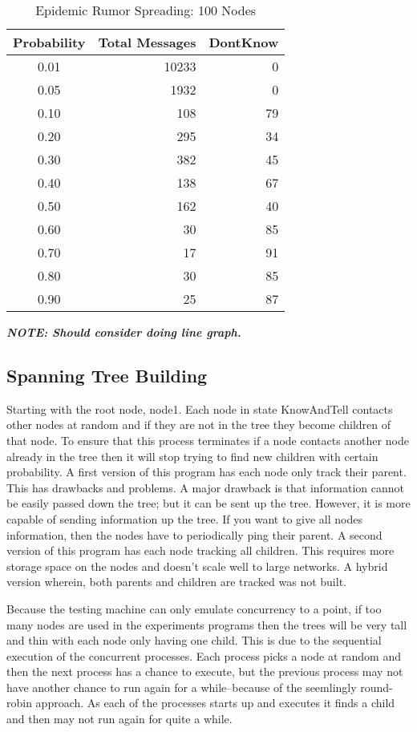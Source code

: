 \documentclass[11pt,twocolumn]{article}
\begin{document}
\begin{table}[h]
\caption{Epidemic Rumor Spreading: 100 Nodes}
\centering
\begin{tabular}{c | r r}
Probability & Total Messages & DontKnow\\
\hline
0.01	& 10233 & 0\\
0.05	& 1932 & 0\\
0.10 & 108 & 79\\
0.20 & 295 & 34\\
0.30 & 382 & 45\\
0.40 & 138 & 67\\
0.50 & 162 & 40\\
0.60 & 30 & 85\\
0.70 & 17 & 91\\
0.80 & 30 & 85\\
0.90 & 25 & 87\\
\hline
\end{tabular}
\label{tab:RumorProbability}
\end{table}

{\bf {\em NOTE: Should consider doing line graph.}}

\subsection{Spanning Tree Building}

Starting with the root node, node1.  Each node in state KnowAndTell contacts other nodes at random and if they are not in the tree they become children of that node.  To ensure that this process terminates if a node contacts another node already in the tree then it will stop trying to find new children with certain probability.  A first version of this program has each node only track their parent.  This has drawbacks and problems.  A major drawback is that information cannot be easily passed down the tree; but it can be sent up the tree.  However, it is more capable of sending information up the tree.  If you want to give all nodes information, then the nodes have to periodically ping their parent.  A second version of this program has each node tracking all children.  This requires more storage space on the nodes and doesn't scale well to large networks.  A hybrid version wherein, both parents and children are tracked was not built.

Because the testing machine can only emulate concurrency to a point, if too many nodes are used in the experiments programs then the trees will be very tall and thin with each node only having one child.  This is due to the sequential execution of the concurrent processes.  Each process picks a node at random and then the next process has a chance to execute, but the previous process may not have another chance to run again for a while--because of the seemlingly round-robin approach.  As each of the processes starts up and executes it finds a child and then may not run again for quite a while.
\end{document}
